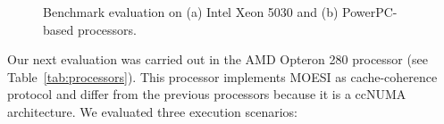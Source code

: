 \documentclass[conference]{IEEEtran}
\begin{document}
\begin{figure}[htb]
\centering
{}
\caption{Benchmark evaluation on (a) Intel Xeon 5030 and (b) PowerPC-based processors.}
\label{fig:xeon_ppc_eval}
\end{figure}

Our next evaluation was carried out in the AMD Opteron 280 processor (see Table~\ref{tab:processors}). This processor implements MOESI as cache-coherence protocol and differ from the previous processors because it is a ccNUMA architecture. We evaluated three execution scenarios:
\end{document}
